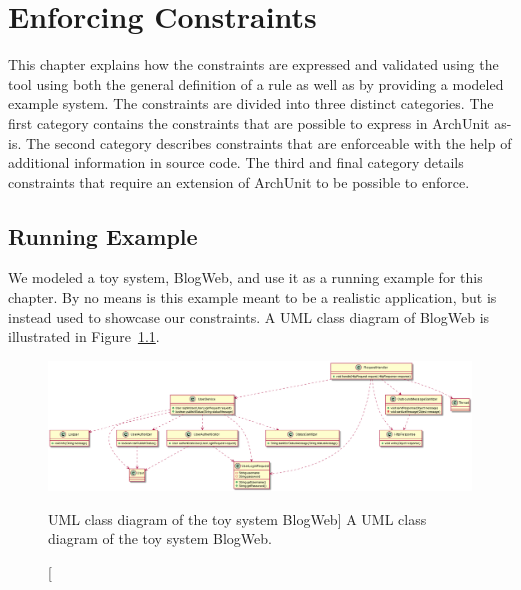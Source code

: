 \chapter{Enforcing Constraints}
\label{ch:enforcing_constraints}

This chapter explains how the constraints are expressed and validated using the tool using both the general definition of a rule as well as by providing a modeled example system. The constraints are divided into three distinct categories. The first category contains the constraints that are possible to express in ArchUnit as-is. The second category describes constraints that are enforceable with the help of additional information in source code. The third and final category details constraints that require an extension of ArchUnit to be possible to enforce.

\section{Running Example}
We modeled a toy system, BlogWeb, and use it as a running example for this chapter. By no means is this example meant to be a realistic application, but is instead used to showcase our constraints.
A UML class diagram of BlogWeb is illustrated in Figure~\ref{fig:toy_application}.


\begin{figure}
    \centering
    \includegraphics[width=\textwidth]{figure/ToyApp.png}
    \caption
        [UML class diagram of the toy system BlogWeb]
        {A UML class diagram of the toy system BlogWeb.}
    \label{fig:toy_application}
\end{figure}

